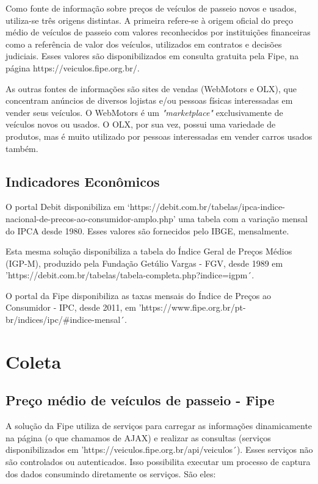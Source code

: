 \documentclass[conference]{IEEEtran}
\begin{document}
Como fonte de informação sobre preços de veículos de passeio novos e usados, utiliza-se três origens distintas. A primeira refere-se à origem oficial do preço médio de veículos de passeio com valores  reconhecidos por instituições financeiras como a referência de valor dos veículos, utilizados em contratos e decisões judiciais. Esses valores são disponibilizados em consulta gratuita pela {Fipe}, na página https://veiculos.fipe.org.br/.  

As outras fontes de informações são sites de vendas (WebMotors e OLX), que concentram anúncios de diversos lojistas e/ou pessoas físicas interessadas em vender seus veículos. O WebMotors é um \textit{"marketplace"} exclusivamente de veículos novos ou usados. O OLX, por sua vez, possui uma variedade de produtos, mas é muito utilizado por pessoas interessadas em vender carros usados também.

\subsection{Indicadores Econômicos}

O portal {Debit} disponibiliza em  `https://debit.com.br/tabelas/ipca-indice-nacional-de-precos-ao-consumidor-amplo.php' uma tabela com a variação mensal do IPCA desde 1980. Esses valores são fornecidos pelo {IBGE}, mensalmente.

Esta mesma solução disponibiliza a tabela do Índice Geral de Preços Médios (IGP-M), produzido pela Fundação Getúlio Vargas - {FGV}, desde 1989 em 'https://debit.com.br/tabelas/tabela-completa.php?indice=igpm´.

O portal da Fipe disponibiliza as taxas mensais do Índice de Preços ao Consumidor - IPC, desde 2011, em 'https://www.fipe.org.br/pt-br/indices/ipc/\#indice-mensal´.


\section{Coleta}

\subsection{Preço médio de veículos de passeio - Fipe}

A solução da Fipe utiliza de serviços para carregar as informações dinamicamente na página (o que chamamos de AJAX) e realizar as consultas (serviços disponibilizados em 'https://veiculos.fipe.org.br/api/veiculos´). Esses serviços não são controlados ou autenticados. Isso possibilita executar um processo de captura dos dados consumindo diretamente os serviços. São eles:
\end{document}
